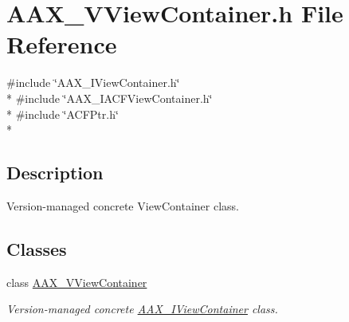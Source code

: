 \hypertarget{a00316}{}\section{A\+A\+X\+\_\+\+V\+View\+Container.\+h File Reference}
\label{a00316}
{\ttfamily \#include \char`\"{}A\+A\+X\+\_\+\+I\+View\+Container.\+h\char`\"{}}\\*
{\ttfamily \#include \char`\"{}A\+A\+X\+\_\+\+I\+A\+C\+F\+View\+Container.\+h\char`\"{}}\\*
{\ttfamily \#include \char`\"{}A\+C\+F\+Ptr.\+h\char`\"{}}\\*


\subsection{Description}
Version-\/managed concrete View\+Container class. 

\subsection*{Classes}
\begin{DoxyCompactItemize}
\item 
class \hyperlink{a00142}{A\+A\+X\+\_\+\+V\+View\+Container}
\begin{DoxyCompactList}\small\item\em Version-\/managed concrete \hyperlink{a00117}{A\+A\+X\+\_\+\+I\+View\+Container} class. \end{DoxyCompactList}\end{DoxyCompactItemize}
